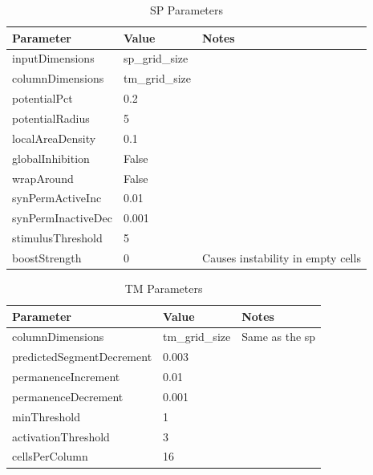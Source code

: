 \begin{table}[H]
    \centering
    \begin{tabularx}{\linewidth}{@{}XlX@{}}
        \toprule
        \textbf{Parameter} & \textbf{Value} & \textbf{Notes}                    \\
        \midrule
        inputDimensions    & sp\_grid\_size &                                   \\
        columnDimensions   & tm\_grid\_size &                                   \\
        potentialPct       & 0.2            &                                   \\
        potentialRadius    & 5              &                                   \\
        localAreaDensity   & 0.1            &                                   \\
        globalInhibition   & False          &                                   \\
        wrapAround         & False          &                                   \\
        synPermActiveInc   & 0.01           &                                   \\
        synPermInactiveDec & 0.001                                              \\
        stimulusThreshold  & 5              &                                   \\
        boostStrength      & 0              & Causes instability in empty cells \\
        \bottomrule
    \end{tabularx}
    \caption{SP Parameters}
    \label{tab:sperm_sp_param}
\end{table}
\begin{table}[H]
    \centering
    \begin{tabularx}{\linewidth}{@{}XlX@{}}
        \toprule
        \textbf{Parameter}        & \textbf{Value} & \textbf{Notes}        \\
        \midrule
        columnDimensions          & tm\_grid\_size & Same as the \gls*{sp} \\
        predictedSegmentDecrement & 0.003          &                       \\
        permanenceIncrement       & 0.01           &                       \\
        permanenceDecrement       & 0.001          &                       \\
        minThreshold              & 1              &                       \\
        activationThreshold       & 3              &                       \\
        cellsPerColumn            & 16             &                       \\
        \bottomrule
    \end{tabularx}
    \caption{TM Parameters}
    \label{tab:sperm_tm_param}
\end{table}
